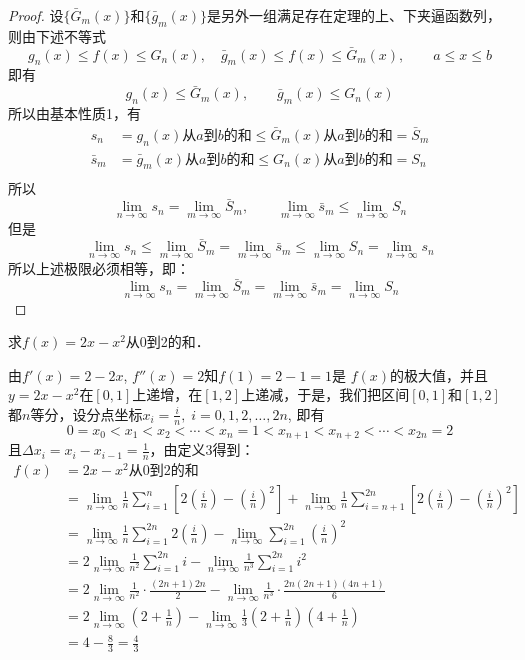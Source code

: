 \begin{proof}
    设$\{\bar G_m(x)\}$和$\{\bar g_m(x)\}$是另外一组满足存在定理的上、下夹逼函数列，则由下述不等式
\[g_n(x)\le f(x)\le G_n(x),\quad \bar g_m(x)\le f(x)\le \bar G_m(x),\qquad a\le x\le b\]
即有
\[g_n(x)\le \bar G_m(x),\qquad \bar g_m(x)\le G_n(x)\]
所以由基本性质1，有
\[\begin{split}
    s_n&=g_n(x)\text{从$a$到$b$的和}\le \bar G_m(x)\text{从$a$到$b$的和}=\bar S_m\\
    \bar s_m&=\bar g_m(x)\text{从$a$到$b$的和}\le G_n(x)\text{从$a$到$b$的和}=S_n\\
\end{split}\]
所以
\[\lim_{n\to\infty}s_n=\lim_{m\to\infty}\bar S_m,\qquad \lim_{m\to\infty}\bar s_m\le \lim_{n\to\infty}S_n\]
但是
\[\lim_{n\to\infty}s_n\le \lim_{m\to\infty}\bar S_m=\lim_{m\to\infty}\bar s_m\le \lim_{n\to\infty} S_n=\lim_{n\to\infty}s_n\]
所以上述极限必须相等，即：
\[\lim_{n\to\infty}s_n= \lim_{m\to\infty}\bar S_m=\lim_{m\to\infty}\bar s_m=\lim_{n\to\infty} S_n\]
\end{proof}

\begin{example}
求$f(x)=2x-x^2$从0到2的和．
\end{example}

\begin{solution}
    由$f'(x)=2-2x$, $f''(x)=2$知$f(1)=2-1=1$是
$f(x)$的极大值，并且$y=2x-x^2$在$[0, 1]$上递增，在$[1,2]$上递减，于是，我们把区间$[0, 1]$和$[1, 2]$都$n$等分，设分点坐标$x_i=\frac{i}{n},\; i=0, 1, 2,\ldots,2n$, 即有
\[0=x_0<x_1<x_2<\cdots <x_n=1<x_{n+1}<x_{n+2}<\cdots <x_{2n}=2\]
且$\Delta x_i=x_i-x_{i-1}=\frac{1}{n}$，由定义3得到：
\[\begin{split}
    f(x)&=2x-x^2\text{从0到2的和}\\
    &=\lim_{n\to\infty}\frac{1}{n}\sum^n_{i=1}\left[2\left(\frac{i}{n}\right)-\left(\frac{i}{n}\right)^2\right]+\lim_{n\to\infty}\frac{1}{n}\sum^{2n}_{i=n+1}\left[2\left(\frac{i}{n}\right)-\left(\frac{i}{n}\right)^2\right] \\
&=\lim_{n\to\infty}\frac{1}{n}\sum^{2n}_{i=1}2\left(\frac{i}{n}\right)-\lim_{n\to\infty}\sum^{2n}_{i=1}\left(\frac{i}{n}\right)^2\\
&=2\lim_{n\to\infty}\frac{1}{n^2}\sum^{2n}_{i=1}i-\lim_{n\to\infty}\frac{1}{n^3}\sum^{2n}_{i=1}i^2\\
&=2\lim_{n\to\infty}\frac{1}{n^2}\cdot \frac{(2n+1)2n}{2}-\lim_{n\to\infty}\frac{1}{n^3}\cdot \frac{2n(2n+1)(4n+1)}{6}\\
&=2\lim_{n\to\infty}\left(2+\frac{1}{n}\right)-\lim_{n\to\infty}\frac{1}{3}\left(2+\frac{1}{n}\right)\left(4+\frac{1}{n}\right)\\
&=4-\frac{8}{3}=\frac{4}{3}
\end{split}\]
\end{solution}

